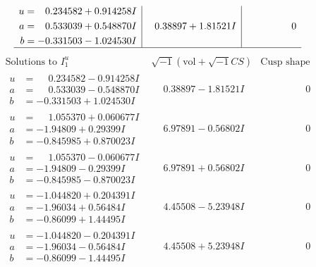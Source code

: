\documentclass[1p]{elsarticle_modified}
\theoremstyle{definition}
\newcommand{\I}{\sqrt{-1}}
\begin{document}
$$\begin{array}{c|c|c}
\begin{aligned}
u &= \phantom{-}0.234582 + 0.914258 I \\
a &= \phantom{-}0.533039 + 0.548870 I \\
b &= -0.331503 - 1.024530 I\end{aligned}
 & \phantom{-}0.38897 + 1.81521 I & \phantom{-0.000000 } 0\\
 \hline 
 \end{array}$$\newpage$$\begin{array}{c|c|c}  
\text{Solutions to }I^u_{1}& \I (\text{vol} + \sqrt{-1}CS) & \text{Cusp shape}\\
 \hline 
\begin{aligned}
u &= \phantom{-}0.234582 - 0.914258 I \\
a &= \phantom{-}0.533039 - 0.548870 I \\
b &= -0.331503 + 1.024530 I\end{aligned}
 & \phantom{-}0.38897 - 1.81521 I & \phantom{-0.000000 } 0 \\ \hline\begin{aligned}
u &= \phantom{-}1.055370 + 0.060677 I \\
a &= -1.94809 + 0.29399 I \\
b &= -0.845985 + 0.870023 I\end{aligned}
 & \phantom{-}6.97891 - 0.56802 I & \phantom{-0.000000 } 0 \\ \hline\begin{aligned}
u &= \phantom{-}1.055370 - 0.060677 I \\
a &= -1.94809 - 0.29399 I \\
b &= -0.845985 - 0.870023 I\end{aligned}
 & \phantom{-}6.97891 + 0.56802 I & \phantom{-0.000000 } 0 \\ \hline\begin{aligned}
u &= -1.044820 + 0.204391 I \\
a &= -1.96034 + 0.56484 I \\
b &= -0.86099 + 1.44495 I\end{aligned}
 & \phantom{-}4.45508 - 5.23948 I & \phantom{-0.000000 } 0 \\ \hline\begin{aligned}
u &= -1.044820 - 0.204391 I \\
a &= -1.96034 - 0.56484 I \\
b &= -0.86099 - 1.44495 I\end{aligned}
 & \phantom{-}4.45508 + 5.23948 I & \phantom{-0.000000 } 0 \\ \hline\begin{aligned}

\end{aligned}
\end{array}$$
\end{document}
